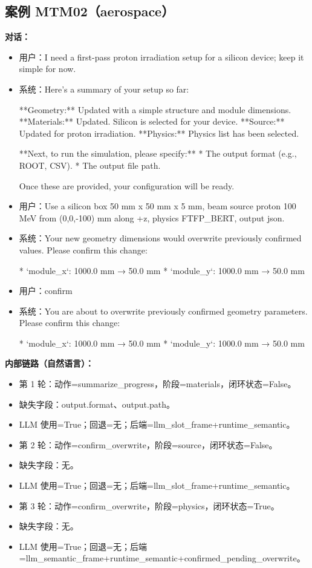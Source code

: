 \documentclass[11pt]{ctexart}
\begin{document}
\subsection{案例 MTM02（aerospace）}
\textbf{对话：}
\begin{itemize}
\item 用户：I need a first-pass proton irradiation setup for a silicon device; keep it simple for now.
\item 系统：Here's a summary of your setup so far:

**Geometry:** Updated with a simple structure and module dimensions.
**Materials:** Updated. Silicon is selected for your device.
**Source:** Updated for proton irradiation.
**Physics:** Physics list has been selected.

**Next, to run the simulation, please specify:**
*   The output format (e.g., ROOT, CSV).
*   The output file path.

Once these are provided, your configuration will be ready.
\item 用户：Use a silicon box 50 mm x 50 mm x 5 mm, beam source proton 100 MeV from (0,0,-100) mm along +z, physics FTFP\_BERT, output json.
\item 系统：Your new geometry dimensions would overwrite previously confirmed values. Please confirm this change:

*   `module\_x`: 1000.0 mm → 50.0 mm
*   `module\_y`: 1000.0 mm → 50.0 mm
\item 用户：confirm
\item 系统：You are about to overwrite previously confirmed geometry parameters. Please confirm this change:

*   `module\_x`: 1000.0 mm → 50.0 mm
*   `module\_y`: 1000.0 mm → 50.0 mm
\end{itemize}
\textbf{内部链路（自然语言）：}
\begin{itemize}
\item 第 1 轮：动作=summarize\_progress，阶段=materials，闭环状态=False。
\item 缺失字段：output.format、output.path。
\item LLM 使用=True；回退=无；后端=llm\_slot\_frame+runtime\_semantic。
\item 第 2 轮：动作=confirm\_overwrite，阶段=source，闭环状态=False。
\item 缺失字段：无。
\item LLM 使用=True；回退=无；后端=llm\_slot\_frame+runtime\_semantic。
\item 第 3 轮：动作=confirm\_overwrite，阶段=physics，闭环状态=True。
\item 缺失字段：无。
\item LLM 使用=True；回退=无；后端=llm\_semantic\_frame+runtime\_semantic+confirmed\_pending\_overwrite。
\end{itemize}
\end{document}
